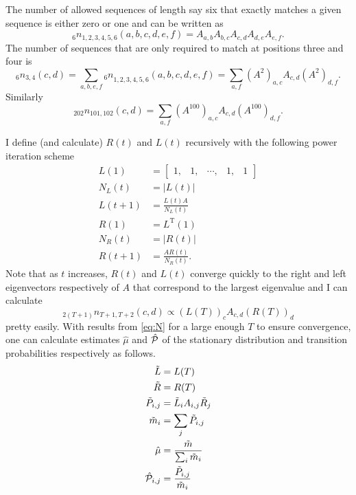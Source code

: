 \documentclass[12pt]{article} \usepackage{amsmath,amsfonts}
\newcommand{\T}{{\cal P}}
\begin{document}
The number of allowed sequences of length say six that exactly matches
a given sequence is either zero or one and can be written as
\begin{equation*}
  _6n_{1,2,3,4,5,6}(a,b,c,d,e,f) = A_{a,b}A_{b,c}A_{c,d}A_{d,e}A_{e,f}.
\end{equation*}
The number of sequences that are only required to match at positions
three and four is
\begin{equation*}
 _6n_{3,4}(c,d) =  \sum_{a,b,e,f} {_6n}_{1,2,3,4,5,6}(a,b,c,d,e,f) =
 \sum_{a,f} \left(A^2\right)_{a,c} A_{c,d} \left(A^2\right)_{d,f}.
\end{equation*}
Similarly
\begin{equation*}
 _{202}n_{101,102}(c,d) = \sum_{a,f} \left(A^{100}\right)_{a,c} A_{c,d} \left(A^{100}\right)_{d,f}.
\end{equation*}

I define (and calculate) $R(t)$ and $L(t)$ recursively with the
following power iteration scheme
\begin{align*}
  L(1) &= \begin{bmatrix} 1,&1,&\cdots,&1,&1\end{bmatrix} \\
  N_L(t) &= \left| L(t) \right| \\
  L(t+1) &= \frac{L(t) A}{N_L(t)} \\
  R(1) &= L^{\text{T}}(1) \\
  N_R(t) &= \left| R(t) \right| \\
  R(t+1) &= \frac{A R(t)}{N_R(t)}.
\end{align*}
Note that as $t$ increases, $R(t)$ and $L(t)$ converge quickly to the
right and left eigenvectors respectively of $A$ that correspond to the
largest eigenvalue and I can calculate
\begin{equation}
  \label{eq:N}
   _{2(T+1)}n_{T+1,T+2}(c,d) \propto \left(L(T)\right)_c  A_{c,d}
   \left(R(T)\right)_d
\end{equation}
pretty easily.  With results from \eqref{eq:N} for a large enough $T$
to ensure convergence, one can calculate estimates $\hat \mu$ and
$\hat \T$ of the stationary distribution and transition probabilities
respectively as follows.
\begin{align*}
  \tilde L &= L(T) \\
  \tilde R &= R(T) \\
  \tilde P_{i,j} &= \tilde L_i A_{i,j} \tilde R_j \\
  \tilde m_i &= \sum_j \tilde P_{i,j} \\
  \hat \mu &= \frac{\tilde m}{\sum_i \tilde m_i} \\
  \hat \T_{i,j} &= \frac{\tilde P_{i,j}}{\tilde m_i}
\end{align*}
\end{document}
